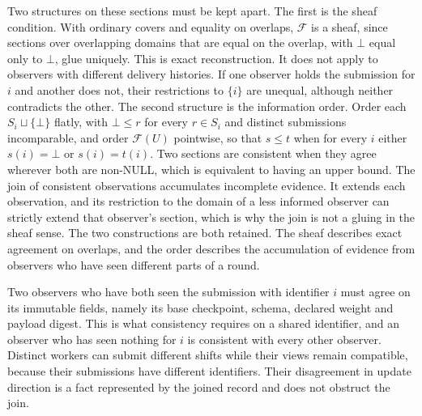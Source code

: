 \documentclass[11pt]{article}
\theoremstyle{definition}
\theoremstyle{remark}
\begin{document}
Two structures on these sections must be kept apart. The first is the sheaf condition. With ordinary covers and equality on overlaps, $\mathcal F$ is a sheaf, since sections over overlapping domains that are equal on the overlap, with $\bot$ equal only to $\bot$, glue uniquely. This is exact reconstruction. It does not apply to observers with different delivery histories. If one observer holds the submission for $i$ and another does not, their restrictions to $\{i\}$ are unequal, although neither contradicts the other. The second structure is the information order. Order each $S_i\sqcup\{\bot\}$ flatly, with $\bot\le r$ for every $r\in S_i$ and distinct submissions incomparable, and order $\mathcal F(U)$ pointwise, so that $s\le t$ when for every $i$ either $s(i)=\bot$ or $s(i)=t(i)$. Two sections are consistent when they agree wherever both are non-NULL, which is equivalent to having an upper bound. The join of consistent observations accumulates incomplete evidence. It extends each observation, and its restriction to the domain of a less informed observer can strictly extend that observer's section, which is why the join is not a gluing in the sheaf sense. The two constructions are both retained. The sheaf describes exact agreement on overlaps, and the order describes the accumulation of evidence from observers who have seen different parts of a round.

Two observers who have both seen the submission with identifier $i$ must agree on its immutable fields, namely its base checkpoint, schema, declared weight and payload digest. This is what consistency requires on a shared identifier, and an observer who has seen nothing for $i$ is consistent with every other observer. Distinct workers can submit different shifts while their views remain compatible, because their submissions have different identifiers. Their disagreement in update direction is a fact represented by the joined record and does not obstruct the join.
\end{document}
